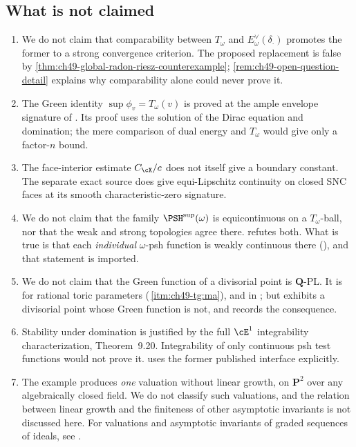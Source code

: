 \subsection{What is not claimed}
\label{sec:ch49-not-claimed}

\begin{enumerate}
\item\label{itm:ch49-nc:question}
      We do not claim that comparability between $T_\omega$ and
      $E^\vee_\omega(\delta_\cdot)$ promotes the former to a strong
      convergence criterion.  The proposed replacement is false by
      \cref{thm:ch49-global-radon-riesz-counterexample};
      \cref{rem:ch49-open-question-detail} explains why comparability alone
      could never prove it.
\item\label{itm:ch49-nc:S}
      The Green identity $\sup\phi_v=T_\omega(v)$ is proved at the
      ample envelope signature of .
      Its proof uses the solution of the Dirac equation and domination;
      the mere comparison of dual energy and $T_\omega$ would give
      only a factor-$n$ bound.
\item\label{itm:ch49-nc:lipschitz}
      The face-interior estimate $C_\cX/c$ does not itself give a
      boundary constant.  The separate exact source
      \cite[Theorem~A.4]{BJ22} does give equi-Lipschitz continuity
      on closed SNC faces at its smooth characteristic-zero signature.
\item\label{itm:ch49-nc:equicontinuity}
      We do not claim that the family $\PSH^{\sup}(\omega)$ is
      equicontinuous on a $T_\omega$-ball, nor that the weak and strong
      topologies agree there.   refutes both.
      What is true is that each \emph{individual} $\omega$-psh function
      is weakly continuous there
      (), and that
      statement is imported.
\item\label{itm:ch49-nc:pl}
      We do not claim that the Green function of a divisorial point is
      $\mathbf Q$-PL.  It is for rational toric parameters
      (\,\cref{itm:ch49-tg:ma}), and in
      ; but \cite[Theorem~60 and Examples~63, 65]{BJGreen24} exhibits a
      divisorial point whose Green function is not, and
       records the consequence.
\item\label{itm:ch49-nc:extreme}
      Stability under domination is justified by the full
      $\cE^1$ integrability characterization, Theorem~9.20.
      Integrability of only continuous psh test functions would not
      prove it.   uses the former
      published interface explicitly.
\item\label{itm:ch49-nc:transcendence}
      The example  produces \emph{one}
      valuation without linear growth, on $\mathbf P^2$ over any
      algebraically closed field.  We do not classify such valuations, and
      the relation between linear growth and the finiteness of other
      asymptotic invariants is not discussed here.  For valuations and
      asymptotic invariants of graded sequences of ideals, see
      \cite{JM12}.
\end{enumerate}
